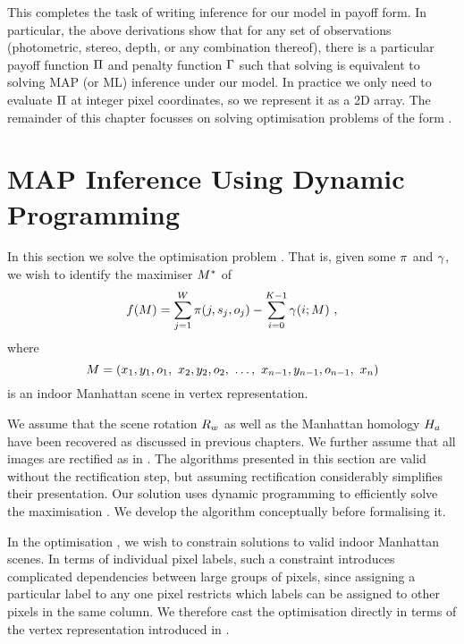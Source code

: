 This completes the task of writing inference for our model in payoff
form. In particular, the above derivations show that for any set of
observations (photometric, stereo, depth, or any combination thereof),
there is a particular payoff function $\ScenePayoff$ and penalty
function $\ScenePenalty$ such that solving  is
equivalent to solving MAP (or ML) inference under our model. In
practice we only need to evaluate $\ScenePayoff$ at integer pixel
coordinates, so we represent it as a 2D array. The remainder of this
chapter focusses on solving optimisation problems of the form
.


\section{MAP Inference Using Dynamic Programming}

In this section we solve the optimisation problem
. That is, given some $\PixelPayoff$ and
$\CornerPenalty$, we wish to identify the maximiser $\OptimalScene$ of
\begin{equation}
  \Objective(\Scene) =
    \sum_{j=1}^{\Width} \PixelPayoff(j,\seam_j,\WallOrient_j) -
    \sum_{i=0}^{\NumWalls-1} \CornerPenalty(i;\Scene) ~,
\end{equation}
where
\begin{equation}
  \Scene =
  ( x_1,y_1,\WallOrient_1,
   ~x_2,y_2,\WallOrient_2,
   ~\ldots,
   ~x_{n-1},y_{n-1},\WallOrient_{n-1}, ~x_n )
\end{equation}
is an indoor Manhattan scene in vertex representation.

We assume that the scene rotation $\SceneR$ as well as the Manhattan
homology $\Hcf$ have been recovered as discussed in
previous chapters. We further assume that all images are rectified
as in . The algorithms presented in this section
are valid without the rectification step, but assuming rectification
considerably simplifies their presentation. Our solution uses dynamic
programming to efficiently solve the maximisation
. We develop the algorithm conceptually before
formalising it.

In the optimisation , we wish to constrain solutions
to valid indoor Manhattan scenes. In terms of individual pixel labels,
such a constraint introduces complicated dependencies between large
groups of pixels, since assigning a particular label to any one pixel
restricts which labels can be assigned to other pixels in the same
column. We therefore cast the optimisation directly in terms of the
vertex representation introduced in .

